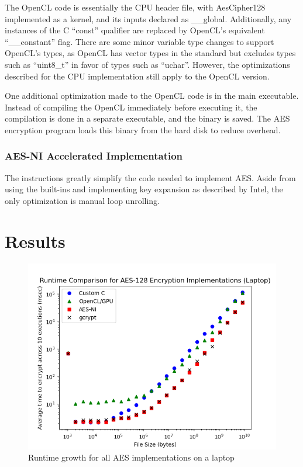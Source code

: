 \documentclass[a4paper,10pt]{article}
\begin{document}
The OpenCL code is essentially the CPU header file, with AesCipher128 implemented as a kernel, and its inputs declared as \_\_global.  Additionally, any instances of the C ``const'' qualifier are replaced by OpenCL's equivalent ``\_\_constant'' flag.  There are some minor variable type changes to support OpenCL's types, as OpenCL has vector types in the standard but excludes types such as ``uint8\_t'' in favor of types such as ``uchar''.  However, the optimizations described for the CPU implementation still apply to the OpenCL version.

One additional optimization made to the OpenCL code is in the main executable.  Instead of compiling the OpenCL immediately before executing it, the compilation is done in a separate executable, and the binary is saved.  The AES encryption program loads this binary from the hard disk to reduce overhead.

\subsubsection{AES-NI Accelerated Implementation}

The instructions greatly simplify the code needed to implement AES.  Aside from using the built-ins and implementing key expansion as described by Intel\cite{intel}, the only optimization is manual loop unrolling.

\section{Results}

\begin{figure}[H]
 \begin{center}
  \includegraphics[width=\textwidth]{results_laptop.png}
  \caption{Runtime growth for all AES implementations on a laptop}
  \label{plot_laptop}
 \end{center}
\end{figure}
\end{document}
